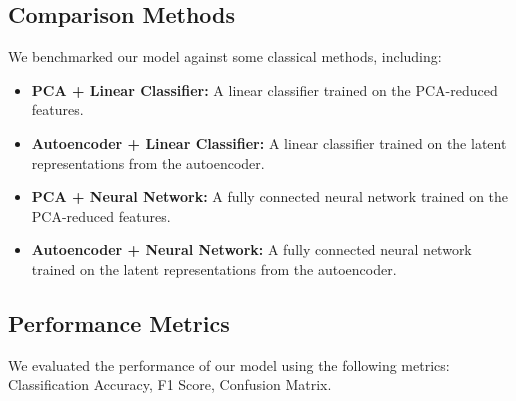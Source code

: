 \documentclass[conference]{IEEEtran}
\begin{document}
\subsection{Comparison Methods}
We benchmarked our model against some
classical methods, including:
\begin{itemize}
    \item \textbf{PCA + Linear Classifier:} 
    A linear classifier trained on the PCA-reduced features.
    
    \item \textbf{Autoencoder + Linear Classifier:} 
    A linear classifier trained on the latent representations from the autoencoder.
    
    \item \textbf{PCA + Neural Network:}
    A fully connected neural network trained on the PCA-reduced features.
    
    \item \textbf{Autoencoder + Neural Network:}
    A fully connected neural network trained on the latent representations from the autoencoder.
\end{itemize}

\subsection{Performance Metrics}
We evaluated the performance of our model using the following metrics:
Classification Accuracy, F1 Score, Confusion Matrix.

    
    
    
\end{document}
